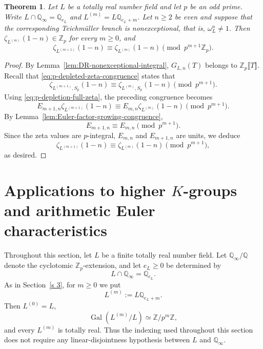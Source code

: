 \documentclass[11pt,table]{amsart}
\newtheorem{theorem}{Theorem}[section]
\numberwithin{equation}{section}
\begin{document}
\begin{theorem}
\label{thm:totally-real-zeta-congruence}
Let \(L\) be a totally real number field and let \(p\) be an odd prime.
Write $L\cap\mathbb Q_\infty
        =
        \mathbb Q_{e_L}$ and $L^{(m)}
        =
        L\mathbb Q_{e_L+m}$. Let \(n\geq2\) be even and suppose that the corresponding
Teichm\"uller branch is nonexceptional, that is, $\omega_L^n\neq1$.
Then $\zeta_{L^{(m)}}(1-n)
        \in
        \mathbb Z_p$ for every \(m\geq0\), and
\begin{equation}
\label{eq:totally-real-zeta-main-congruence}
        \zeta_{L^{(m+1)}}(1-n)
        \equiv
        \zeta_{L^{(m)}}(1-n)
        \pmod{p^{m+1}\mathbb Z_p}.
\end{equation}
\end{theorem}

\begin{proof}
By Lemma~\ref{lem:DR-nonexceptional-integral}, 
\(G_{L,n}(T)\) belongs to
\(\mathbb Z_p\llbracket T\rrbracket\). Recall that \eqref{eq:p-depleted-zeta-congruence} states that
\[
        \zeta_{L^{(m+1)},S_p}(1-n)
        \equiv
        \zeta_{L^{(m)},S_p}(1-n)
        \pmod{p^{m+1}}.
\]
\noindent Using
\eqref{eq:p-depletion-full-zeta}, the preceding congruence becomes
\[
        E_{m+1,n}
        \zeta_{L^{(m+1)}}(1-n)
        \equiv
        E_{m,n}
        \zeta_{L^{(m)}}(1-n)
        \pmod{p^{m+1}}.
\]
By Lemma~\ref{lem:Euler-factor-growing-congruence},
\[
        E_{m+1,n}
        \equiv
        E_{m,n}
        \pmod{p^{m+1}}.
\]
Since the zeta values are \(p\)-integral, $E_{m,n}$ and \(E_{m+1,n}\) are units, we
deduce
\[
        \zeta_{L^{(m+1)}}(1-n)
        \equiv
        \zeta_{L^{(m)}}(1-n)
        \pmod{p^{m+1}},
\]
as desired.
\end{proof}

\section{Applications to higher \(K\)-groups and arithmetic Euler characteristics}\label{s 4}

\label{sec:applications-k-groups-euler-characteristics}

\par Throughout this section, let \(L\) be a finite totally real number
field.  Let \(\mathbb Q_\infty/\mathbb Q\) denote the cyclotomic
\(\mathbb Z_p\)-extension, and let \(e_L\geq0\) be determined by
\[
        L\cap\mathbb Q_\infty=\mathbb Q_{e_L}.
\]
As in Section~\ref{s 3}, for \(m\geq0\) we put
\[
        L^{(m)}
        :=
        L\mathbb Q_{e_L+m}.
\]
Then \(L^{(0)}=L\),
\[
        \operatorname{Gal}(L^{(m)}/L)
        \simeq
        \mathbb Z/p^m\mathbb Z,
\]
and every \(L^{(m)}\) is totally real.  Thus the indexing used throughout
this section does not require any linear-disjointness hypothesis between
\(L\) and \(\mathbb Q_\infty\).
\end{document}
